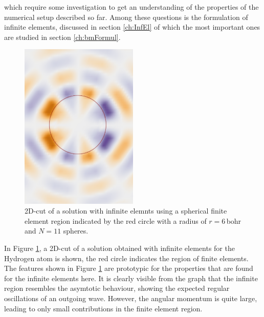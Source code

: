 which require some investigation to get an understanding of the properties of the numerical setup described so far.
Among these questions is the formulation of infinite elements, discussed in section \ref{ch:InfEl} of which the most important ones are studied in section \ref{ch:bmFormul}.
\begin{figure}
\includegraphics[width=0.5\textwidth]{Figures/BC/plane_fin}
\caption{2D-cut of a solution with infinite elemnts using a spherical finite element region indicated by the red circle with a radius of $r=6\,$bohr and $N=11$ spheres.}
\label{fig:cutInf}
\end{figure}
In Figure \ref{fig:cutInf}, a 2D-cut of a solution obtained with infinite elements for the Hydrogen atom is shown, the red circle indicates the region of finite elements.
The features shown in Figure \ref{fig:cutInf} are prototypic for the properties that are found for the infinite elements here.
It is clearly visible from the graph that the infinite region resembles the asymtotic behaviour, showing the expected regular oscillations of an outgoing wave.
However, the angular momentum is quite large, leading to only small contributions in the finite element region.

